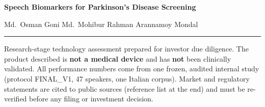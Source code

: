 \documentclass[10pt,a4paper]{article}
\begin{document}
\begin{center}{\LARGE\bfseries Speech Biomarkers for Parkinson's Disease Screening\par}\vspace{4pt}{\large Technology assessment and venture whitepaper (research stage)\par}\vspace{4pt}
{\small Md.~Osman Goni \textperiodcentered{} Md.~Mohibur Rahman \textperiodcentered{} Arannamoy Mondal\par}\end{center}\vspace{2pt}\hrule\vspace{4pt}
\tableofcontents\newpage
\begin{tcolorbox}[colback=blue!3,colframe=blue!45!black,boxrule=0.5pt,arc=2pt,left=5pt,right=5pt,top=3pt,bottom=3pt,title={\small\bfseries Status and reading guide}]\small Research-stage technology assessment prepared for investor due diligence. The product described is \textbf{not a medical device} and has \textbf{not} been clinically validated. All performance numbers come from one frozen, audited internal study (protocol FINAL\_V1, 47 speakers, one Italian corpus). Market and regulatory statements are cited to public sources (reference list at the end) and must be re-verified before any filing or investment decision.\end{tcolorbox}
\end{document}
